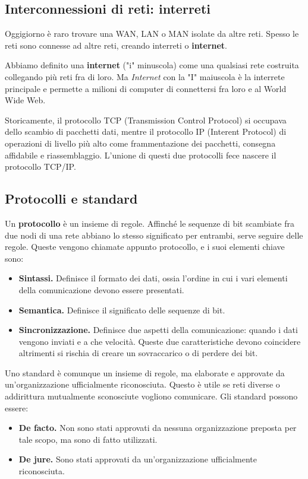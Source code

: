     \subsection{Interconnessioni di reti: interreti}
        Oggigiorno è raro trovare una WAN, LAN o MAN isolate da altre reti. Spesso le reti sono connesse ad altre reti, creando interreti o \textbf{internet}.
            
        Abbiamo definito una \textbf{internet} ("i" minuscola) come una qualsiasi rete costruita collegando più reti fra di loro. Ma \textit{Internet} con la "I" maiuscola è la interrete principale e permette a milioni di computer di connettersi fra loro e al World Wide Web.
            
        Storicamente, il protocollo TCP (Transmission Control Protocol) si occupava dello scambio di pacchetti dati, mentre il protocollo IP (Interent Protocol) di operazioni di livello più alto come frammentazione dei pacchetti, consegna affidabile e riassemblaggio. L'unione di questi due protocolli fece nascere il protocollo TCP/IP.
            
    \subsection{Protocolli e standard}
        Un \textbf{protocollo} è un insieme di regole. Affinché le sequenze di bit scambiate fra due nodi di una rete abbiano lo stesso significato per entrambi, serve seguire delle regole. Queste vengono chiamate appunto protocollo, e i suoi elementi chiave sono:
        \begin{itemize}
            \item \textbf{Sintassi.} Definisce il formato dei dati, ossia l'ordine in cui i vari elementi della comunicazione devono essere presentati.
            
            \item \textbf{Semantica.} Definisce il significato delle sequenze di bit.
            
            \item \textbf{Sincronizzazione.} Definisce due aspetti della comunicazione: quando i dati vengono inviati e a che velocità. Queste due caratteristiche devono coincidere altrimenti si rischia di creare un sovraccarico o di perdere dei bit.
        \end{itemize}
        
        Uno standard è comunque un insieme di regole, ma elaborate e approvate da un'organizzazione ufficialmente riconosciuta. Questo è utile se reti diverse o addirittura mutualmente sconosciute vogliono comunicare. Gli standard possono essere:
        \begin{itemize}
            \item \textbf{De facto.} Non sono stati approvati da nessuna organizzazione preposta per tale scopo, ma sono di fatto utilizzati.
            
            \item \textbf{De jure.} Sono stati approvati da un'organizzazione ufficialmente riconosciuta.
        \end{itemize}